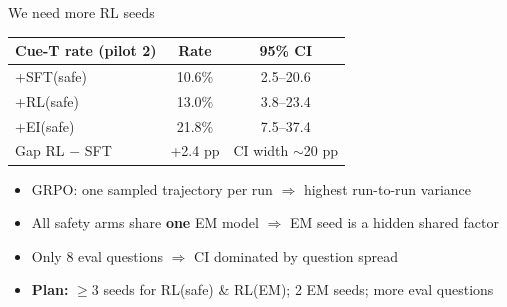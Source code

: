 \documentclass{beamer}
\begin{document}
\begin{frame}{We need more RL seeds}
  \centering\small
  \begin{tabular}{@{}lcc@{}}
    \toprule
    Cue-T rate (pilot 2) & Rate & 95\% CI \\
    \midrule
    \textcolor{sftc}{+SFT(safe)} & 10.6\% & 2.5--20.6 \\
    \textcolor{rlc}{+RL(safe)} & 13.0\% & 3.8--23.4 \\
    \textcolor{eic}{+EI(safe)} & 21.8\% & 7.5--37.4 \\
    \midrule
    Gap RL $-$ SFT & +2.4 pp & CI width $\sim$20 pp \\
    \bottomrule
  \end{tabular}
  \vspace{1em}
  \begin{itemize}\setlength\itemsep{0.4em}
    \item GRPO: one sampled trajectory per run $\Rightarrow$ highest run-to-run variance
    \item All safety arms share \textbf{one} EM model $\Rightarrow$ EM seed is a hidden shared factor
    \item Only 8 eval questions $\Rightarrow$ CI dominated by question spread
    \item \textbf{Plan:} $\geq$3 seeds for RL(safe) \& RL(EM); 2 EM seeds; more eval questions
  \end{itemize}
\end{frame}
\end{document}

